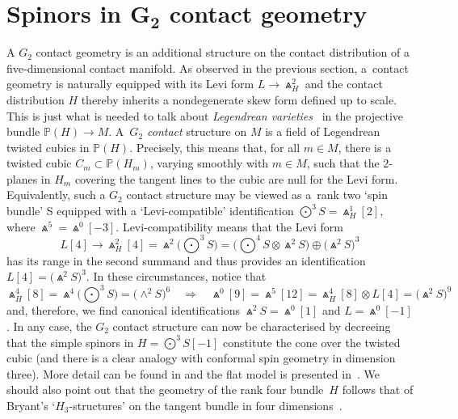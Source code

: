 \documentclass[10pt,a4paper]{amsart}
\numberwithin{equation}{section}
\begin{document}
\section[Spinors in G\_2 contact geometry]{Spinors in $\boldsymbol{G_2}$ contact geometry}\label{G2}
A $G_2$ contact geometry is an additional structure on the contact distribution
of a five-dimensional contact manifold. As observed in the previous section, a~contact geometry is naturally equipped with its Levi form $L\to\Wedge_H^2$ and
the contact distribution $H$ thereby inherits a nondegenerate skew form
defined up to scale. This is just what is needed to talk about {\em Legendrean
varieties}~\cite{LM} in the projective bundle ${\mathbb{P}}(H)\to M$. A~{\em $G_2$ contact} structure on $M$ is a field of Legendrean twisted cubics
in ${\mathbb{P}}(H)$. Precisely, this means that, for all $m\in M$, there is a
twisted cubic $C_m\subset{\mathbb{P}}(H_m)$, varying smoothly with $m\in M$,
such that the $2$-planes in $H_m$ covering the tangent lines to the cubic are
null for the Levi form. Equivalently, such a $G_2$ contact structure may be
viewed as a~rank two `spin bundle' S equipped with a `Levi-compatible'
identification $\bigodot^3\!S=\Wedge_H^1[2]$, where $\Wedge^5=\Wedge^0[-3]$.
Levi-compatibility means that the Levi form
\[\textstyle
L[4]\to\Wedge_H^2[4]=\Wedge^2\big({\bigodot}^3\!S\big)
=\big({\bigodot}^4\!S\otimes\Wedge^2S\big)\oplus\big({\Wedge}^2S\big)^3\]
has its range in the second summand and thus provides an identification
$L[4]=\big({\Wedge}^2S\big)^3$. In these circumstances, notice that
\[\textstyle\Wedge_H^4[8]=\Wedge^4\big({\bigodot}^3\!S\big)=\big({\wedge}^2S\big)^6\quad
\Rightarrow\quad
\Wedge^0[9]=\Wedge^5[12]=\Wedge_H^4[8]\otimes L[4]=
\big({\Wedge}^2S\big)^9\]
and, therefore, we find canonical identifications $\Wedge^2S=\Wedge^0[1]$ and
$L=\Wedge^0[-1]$. In any case, the $G_2$ contact structure can now be
characterised by decreeing that the simple spinors in $H=\bigodot^3\!S[-1]$
constitute the cone over the twisted cubic (and there is a clear analogy with
conformal spin geometry in dimension three). More detail can be found in
\cite[Section~5]{EN2} and the flat model is presented in~\cite[Section~4]{EN1}. We should
also point out that the geometry of the rank four bundle~$H$ follows that of
Bryant's `$H_3$-structures' on the tangent bundle in four dimensions~\cite{B}.
\end{document}
